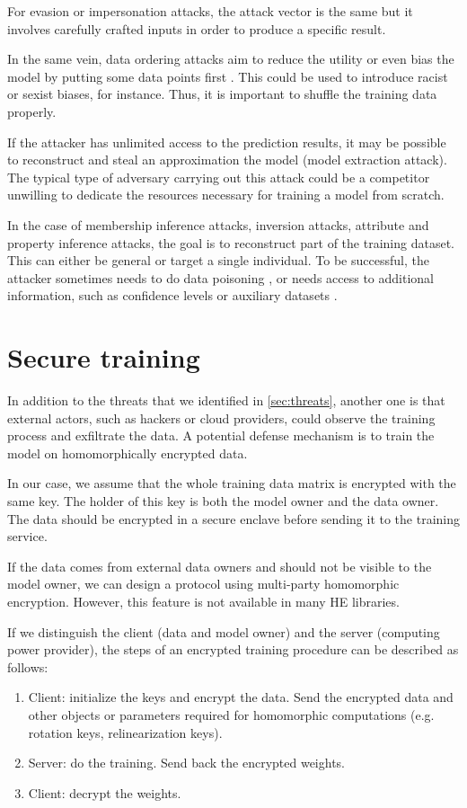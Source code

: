 \documentclass[a4paper,11pt,oneside]{report}
\begin{document}
For evasion or impersonation attacks, the attack vector is the same but it involves carefully crafted inputs in order to produce a specific result. 

In the same vein, data ordering attacks aim to reduce the utility or even bias the model by putting some data points first \cite{shumailov_manipulating_2021}. This could be used to introduce racist or sexist biases, for instance. Thus, it is important to shuffle the training data properly.

If the attacker has unlimited access to the prediction results, it may be possible to reconstruct and steal an approximation the model (model extraction attack). The typical type of adversary carrying out this attack could be a competitor unwilling to dedicate the resources necessary for training a model from scratch.

In the case of membership inference attacks, inversion attacks, attribute and property inference attacks, the goal is to reconstruct part of the training dataset. This can either be general or target a single individual. To be successful, the attacker sometimes needs to do data poisoning \cite{hidano_model_2017}, or needs access to additional information, such as confidence levels or auxiliary datasets \cite{fredrikson_model_2015, wang_variational_2022}.


\section{Secure training}\label{sec:secure_training}

In addition to the threats that we identified in \autoref{sec:threats}, another one is that external actors, such as hackers or cloud providers, could observe the training process and exfiltrate the data. A potential defense mechanism is to train the model on homomorphically encrypted data.

In our case, we assume that the whole training data matrix is encrypted with the same key. The holder of this key is both the model owner and the data owner. The data should be encrypted in a secure enclave before sending it to the training service. 

If the data comes from external data owners and should not be visible to the model owner, we can design a protocol using multi-party homomorphic encryption. However, this feature is not available in many HE libraries.

If we distinguish the client (data and model owner) and the server (computing power provider), the steps of an encrypted training procedure can be described as follows:
\begin{enumerate}
    \item Client: initialize the keys and encrypt the data. Send the encrypted data and other objects or parameters required for homomorphic computations (e.g. rotation keys, relinearization keys).
    \item Server: do the training. Send back the encrypted weights.
    \item Client: decrypt the weights.
\end{enumerate}
\end{document}
